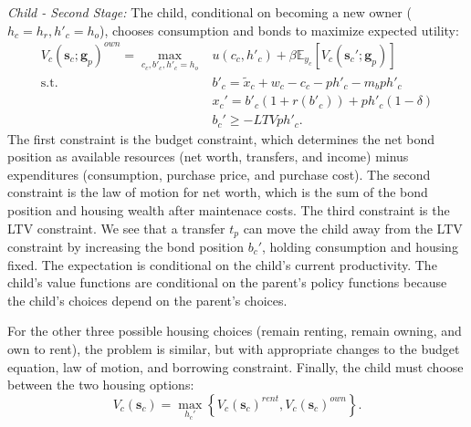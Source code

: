 \documentclass[12pt]{article}
\newcommand{\E}{\mathbb{E}}
\begin{document}
\textit{Child - Second Stage:} The child, conditional on becoming a new owner ($h_c=h_r,h'_c=h_o$), chooses consumption and bonds to maximize expected utility:
\begin{equation}\label{eq:Vk}
\begin{split}
 V_c(\mathbf{s}_c;\mathbf{g}_p)^{own} = \max_{c_c,b'_c,h'_c=h_o} & u(c_c,h'_c) + \beta \E_{y_c}\left[V_{c}(\mathbf{s}_c';\mathbf{g}_p) \right] \\ 
 \text{s.t.}\quad & 	b'_c = \tilde x_c + w_c - c_c - p h'_c - m_b p h'_c \\
 & x_c' = b'_c(1+r(b'_c)) + p h'_c(1-\delta) \\
 & b_c' \ge - LTV p h'_c. 
\end{split}
\end{equation}
The first constraint is the budget constraint, which determines the net bond position as available resources (net worth, transfers, and income) minus expenditures (consumption, purchase price, and purchase cost). The second constraint is the law of motion for net worth, which is the sum of the bond position and housing wealth after maintenace costs. The third constraint is the LTV constraint. We see that a transfer $t_p$ can move the child away from the LTV constraint by increasing the bond position $b_c'$, holding consumption and housing fixed. The expectation is conditional on the child's current productivity. The child's value functions are conditional on the parent's policy functions because the child's choices depend on the parent's choices.

For the other three possible housing choices (remain renting, remain owning, and own to rent), the problem is similar, but with appropriate changes to the budget equation, law of motion, and borrowing constraint. Finally, the child must choose between the two housing options:
\begin{equation}
	V_c(\mathbf{s}_c) = \max_{h_c'} \left\{V_c(\mathbf{s}_c)^{rent},V_c(\mathbf{s}_c)^{own}\right\}.
\end{equation}
\end{document}
